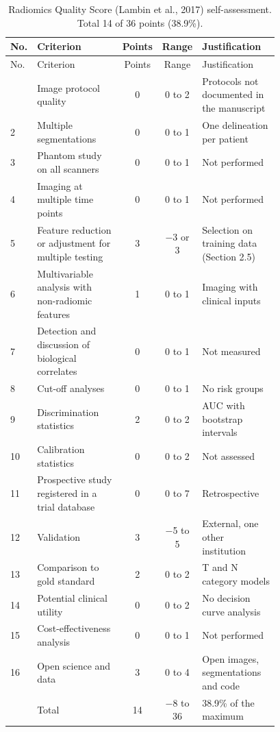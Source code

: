 \begin{longtable}{@{}L{0.04\linewidth}L{0.40\linewidth}ccL{0.34\linewidth}@{}}
\caption{Radiomics Quality Score (Lambin et al., 2017) self-assessment. Total 14 of 36 points (38.9\%).}\label{tab:rqs}\\
\toprule
No. & Criterion & Points & Range & Justification \\
\midrule
\endfirsthead
\toprule
No. & Criterion & Points & Range & Justification \\
\midrule
\endhead
\bottomrule
{} & Image protocol quality & 0 & 0 to 2 & Protocols not documented in the manuscript \\
2 & Multiple segmentations & 0 & 0 to 1 & One delineation per patient \\
3 & Phantom study on all scanners & 0 & 0 to 1 & Not performed \\
4 & Imaging at multiple time points & 0 & 0 to 1 & Not performed \\
5 & Feature reduction or adjustment for multiple testing & 3 & $-$3 or 3 & Selection on training data (Section 2.5) \\
6 & Multivariable analysis with non-radiomic features & 1 & 0 to 1 & Imaging with clinical inputs \\
7 & Detection and discussion of biological correlates & 0 & 0 to 1 & Not measured \\
8 & Cut-off analyses & 0 & 0 to 1 & No risk groups \\
9 & Discrimination statistics & 2 & 0 to 2 & AUC with bootstrap intervals \\
10 & Calibration statistics & 0 & 0 to 2 & Not assessed \\
11 & Prospective study registered in a trial database & 0 & 0 to 7 & Retrospective \\
12 & Validation & 3 & $-$5 to 5 & External, one other institution \\
13 & Comparison to gold standard & 2 & 0 to 2 & T and N category models \\
14 & Potential clinical utility & 0 & 0 to 2 & No decision curve analysis \\
15 & Cost-effectiveness analysis & 0 & 0 to 1 & Not performed \\
16 & Open science and data & 3 & 0 to 4 & Open images, segmentations and code \\
\midrule
 & Total & 14 & $-$8 to 36 & 38.9\% of the maximum \\
\end{longtable}
